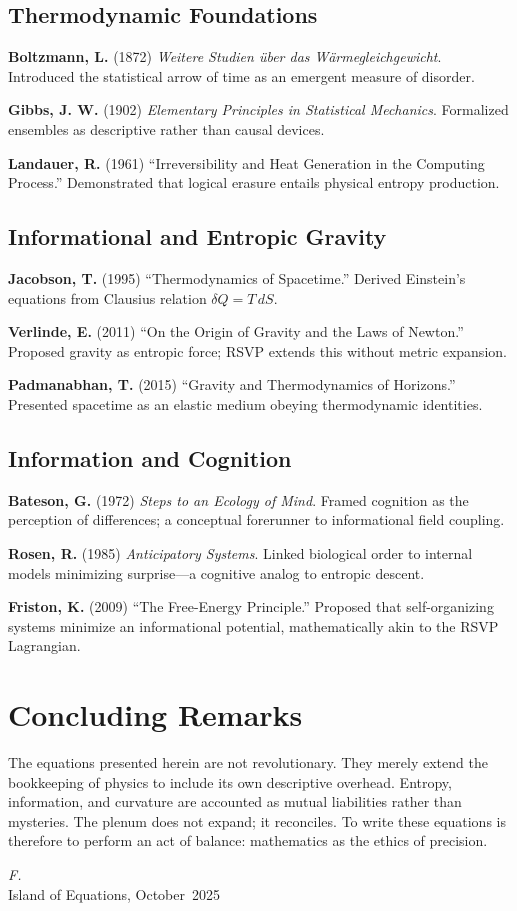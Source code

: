 \documentclass[12pt]{article}
\begin{document}
\subsection*{Thermodynamic Foundations}
\textbf{Boltzmann, L.} (1872) \textit{Weitere Studien über das Wärmegleichgewicht}.  
Introduced the statistical arrow of time as an emergent measure of disorder.

\textbf{Gibbs, J. W.} (1902) \textit{Elementary Principles in Statistical Mechanics}.  
Formalized ensembles as descriptive rather than causal devices.

\textbf{Landauer, R.} (1961) ``Irreversibility and Heat Generation in the Computing Process.''  
Demonstrated that logical erasure entails physical entropy production.

\subsection*{Informational and Entropic Gravity}
\textbf{Jacobson, T.} (1995) ``Thermodynamics of Spacetime.''  
Derived Einstein’s equations from Clausius relation $\delta Q = T\,dS$.

\textbf{Verlinde, E.} (2011) ``On the Origin of Gravity and the Laws of Newton.''  
Proposed gravity as entropic force; RSVP extends this without metric expansion.

\textbf{Padmanabhan, T.} (2015) ``Gravity and Thermodynamics of Horizons.''  
Presented spacetime as an elastic medium obeying thermodynamic identities.

\subsection*{Information and Cognition}
\textbf{Bateson, G.} (1972) \textit{Steps to an Ecology of Mind}.  
Framed cognition as the perception of differences; a conceptual forerunner to informational field coupling.

\textbf{Rosen, R.} (1985) \textit{Anticipatory Systems}.  
Linked biological order to internal models minimizing surprise---a cognitive analog to entropic descent.

\textbf{Friston, K.} (2009) ``The Free-Energy Principle.''  
Proposed that self-organizing systems minimize an informational potential, mathematically akin to the RSVP Lagrangian.

\section{Concluding Remarks}

The equations presented herein are not revolutionary.  
They merely extend the bookkeeping of physics to include its own descriptive overhead.
Entropy, information, and curvature are accounted as mutual liabilities rather than mysteries.
The plenum does not expand; it reconciles.
To write these equations is therefore to perform an act of balance: mathematics as the ethics of precision.

\begin{flushright}
\textit{F.}\\
\small Island of Equations, October~2025
\end{flushright}
\end{document}
